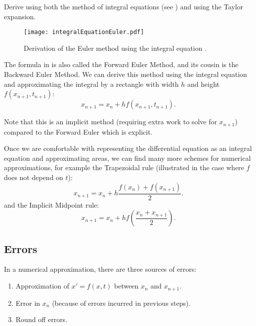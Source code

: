 \begin{exercise}
	Derive  using both the method of integral equations (see ) and using the Taylor expansion.
\end{exercise}

\begin{figure}[!ht]
	\centering
	\texttt{[image: integralEquationEuler.pdf]}
	\caption{Derivation of the Euler method using the integral equation \cite[Figure 8.1.1]{boyce}.}
	\label{fig:eulerint}
\end{figure}

The formula in  is also called the Forward Euler Method, and its cousin is the Backward Euler Method. We can derive this method using the integral equation and approximating the integral by a rectangle with width $h$ and height $f(x_{n+1}, t_{n+1})$:
\begin{equation}
	x_{n+1} = x_n + h f(x_{n+1}, t_{n+1}).
\end{equation}

Note that this is an implicit method (requiring extra work to solve for $x_{n+1}$) compared to the Forward Euler which is explicit.

Once we are comfortable with representing the differential equation as an integral equation and approximating areas, we can find many more schemes for numerical approximations, for example the Trapezoidal rule (illustrated in the case where $f$ does not depend on $t$):
\begin{equation}
	x_{n+1} = x_n + h \frac{f(x_n)+f(x_{n+1})}{2}.
\end{equation}
and the Implicit Midpoint rule:
\begin{equation}
	x_{n+1} = x_n + h f\left(\frac{x_n+x_{n+1}}{2}\right).
\end{equation}

\subsection{Errors}

In a numerical approximation, there are three sources of errors:
\begin{enumerate}
	\item Approximation of $x' = f(x,t)$ between $x_n$ and $x_{n+1}$.
	\item Error in $x_n$ (because of errors incurred in previous steps).
	\item Round off errors.
\end{enumerate}

